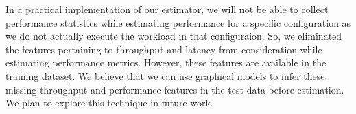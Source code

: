 In a practical implementation of our estimator, we will not be able
to collect performance statistics while estimating performance for
a specific configuration as we do not actually execute the workload
in that configuraion. So, we eliminated the features pertaining to 
throughput and latency from consideration while estimating 
performance metrics.
However, these features are available in the training dataset. 
We believe that we can use graphical models to infer these 
missing throughput and performance features in the test data 
before estimation. We plan to explore this technique in 
future work.